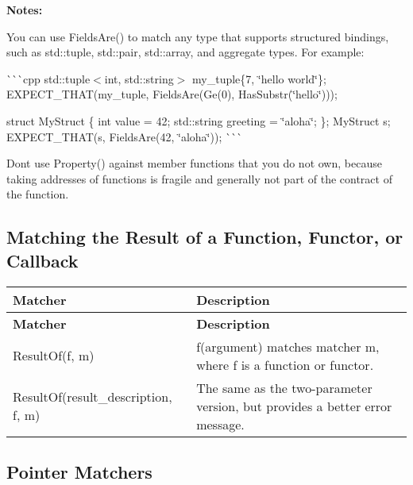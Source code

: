 {\bfseries Notes\+:}


\begin{DoxyItemize}
\item You can use {\ttfamily Fields\+Are()} to match any type that supports structured bindings, such as {\ttfamily std\+::tuple}, {\ttfamily std\+::pair}, {\ttfamily std\+::array}, and aggregate types. For example\+:

\`{}\`{}\`{}cpp std\+::tuple$<$int, std\+::string$>$ my\+\_\+tuple\{7, \char`\"{}hello world\char`\"{}\}; E\+X\+P\+E\+C\+T\+\_\+\+T\+H\+AT(my\+\_\+tuple, Fields\+Are(Ge(0), Has\+Substr(\char`\"{}hello\char`\"{})));

struct My\+Struct \{ int value = 42; std\+::string greeting = \char`\"{}aloha\char`\"{}; \}; My\+Struct s; E\+X\+P\+E\+C\+T\+\_\+\+T\+H\+AT(s, Fields\+Are(42, \char`\"{}aloha\char`\"{})); \`{}\`{}\`{}
\item Don\textquotesingle{}t use {\ttfamily Property()} against member functions that you do not own, because taking addresses of functions is fragile and generally not part of the contract of the function.
\end{DoxyItemize}

\subsection*{Matching the Result of a Function, Functor, or Callback}

\tabulinesep=1mm
\begin{longtabu} spread 0pt [c]{*{2}{|X[-1]}|}
\hline
\rowcolor{\tableheadbgcolor}\textbf{ Matcher  }&\textbf{ Description   }\\
\endfirsthead
\hline
\endfoot
\hline
\rowcolor{\tableheadbgcolor}\textbf{ Matcher  }&\textbf{ Description   }\\
\endhead
{\ttfamily Result\+Of(f, m)}  &{\ttfamily f(argument)} matches matcher {\ttfamily m}, where {\ttfamily f} is a function or functor.   \\
{\ttfamily Result\+Of(result\+\_\+description, f, m)}  &The same as the two-\/parameter version, but provides a better error message.   \\
\end{longtabu}


\subsection*{Pointer Matchers}

